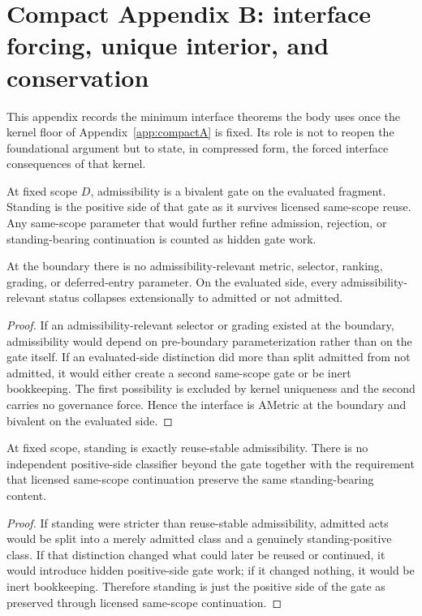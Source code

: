 \section{Compact Appendix B: interface forcing, unique interior, and conservation}
\label{app:interface}

This appendix records the minimum interface theorems the body uses once the kernel floor of Appendix~\ref{app:compactA} is fixed. Its role is not to reopen the foundational argument but to state, in compressed form, the forced interface consequences of that kernel.

\begin{definition}
At fixed scope $D$, admissibility is a bivalent gate on the evaluated fragment. Standing is the positive side of that gate as it survives licensed same-scope reuse. Any same-scope parameter that would further refine admission, rejection, or standing-bearing continuation is counted as hidden gate work.
\end{definition}

\begin{theorem}
At the boundary there is no admissibility-relevant metric, selector, ranking, grading, or deferred-entry parameter. On the evaluated side, every admissibility-relevant status collapses extensionally to admitted or not admitted.
\end{theorem}

\begin{proof}
If an admissibility-relevant selector or grading existed at the boundary, admissibility would depend on pre-boundary parameterization rather than on the gate itself. If an evaluated-side distinction did more than split admitted from not admitted, it would either create a second same-scope gate or be inert bookkeeping. The first possibility is excluded by kernel uniqueness and the second carries no governance force. Hence the interface is AMetric at the boundary and bivalent on the evaluated side.
\end{proof}

\begin{theorem}
At fixed scope, standing is exactly reuse-stable admissibility. There is no independent positive-side classifier beyond the gate together with the requirement that licensed same-scope continuation preserve the same standing-bearing content.
\end{theorem}

\begin{proof}
If standing were stricter than reuse-stable admissibility, admitted acts would be split into a merely admitted class and a genuinely standing-positive class. If that distinction changed what could later be reused or continued, it would introduce hidden positive-side gate work; if it changed nothing, it would be inert bookkeeping. Therefore standing is just the positive side of the gate as preserved through licensed same-scope continuation.
\end{proof}

